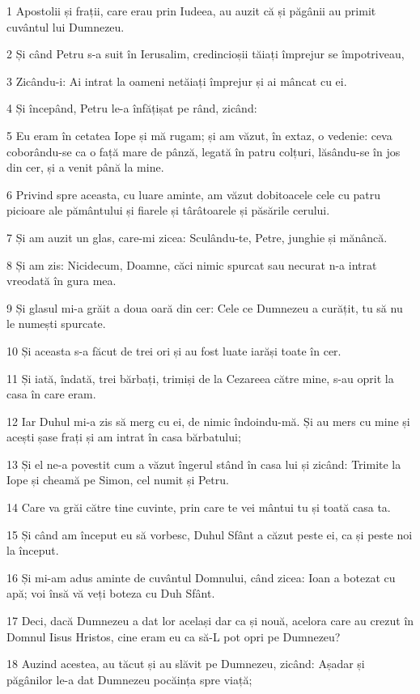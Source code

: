 \par 1 Apostolii și frații, care erau prin Iudeea, au auzit că și păgânii au primit cuvântul lui Dumnezeu.
\par 2 Și când Petru s-a suit în Ierusalim, credincioșii tăiați împrejur se împotriveau,
\par 3 Zicându-i: Ai intrat la oameni netăiați împrejur și ai mâncat cu ei.
\par 4 Și începând, Petru le-a înfățișat pe rând, zicând:
\par 5 Eu eram în cetatea Iope și mă rugam; și am văzut, în extaz, o vedenie: ceva coborându-se ca o față mare de pânză, legată în patru colțuri, lăsându-se în jos din cer, și a venit până la mine.
\par 6 Privind spre aceasta, cu luare aminte, am văzut dobitoacele cele cu patru picioare ale pământului și fiarele și târâtoarele și păsările cerului.
\par 7 Și am auzit un glas, care-mi zicea: Sculându-te, Petre, junghie și mănâncă.
\par 8 Și am zis: Nicidecum, Doamne, căci nimic spurcat sau necurat n-a intrat vreodată în gura mea.
\par 9 Și glasul mi-a grăit a doua oară din cer: Cele ce Dumnezeu a curățit, tu să nu le numești spurcate.
\par 10 Și aceasta s-a făcut de trei ori și au fost luate iarăși toate în cer.
\par 11 Și iată, îndată, trei bărbați, trimiși de la Cezareea către mine, s-au oprit la casa în care eram.
\par 12 Iar Duhul mi-a zis să merg cu ei, de nimic îndoindu-mă. Și au mers cu mine și acești șase frați și am intrat în casa bărbatului;
\par 13 Și el ne-a povestit cum a văzut îngerul stând în casa lui și zicând: Trimite la Iope și cheamă pe Simon, cel numit și Petru.
\par 14 Care va grăi către tine cuvinte, prin care te vei mântui tu și toată casa ta.
\par 15 Și când am început eu să vorbesc, Duhul Sfânt a căzut peste ei, ca și peste noi la început.
\par 16 Și mi-am adus aminte de cuvântul Domnului, când zicea: Ioan a botezat cu apă; voi însă vă veți boteza cu Duh Sfânt.
\par 17 Deci, dacă Dumnezeu a dat lor același dar ca și nouă, acelora care au crezut în Domnul Iisus Hristos, cine eram eu ca să-L pot opri pe Dumnezeu?
\par 18 Auzind acestea, au tăcut și au slăvit pe Dumnezeu, zicând: Așadar și păgânilor le-a dat Dumnezeu pocăința spre viață;
